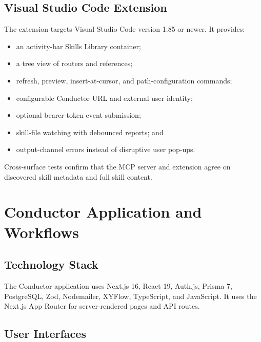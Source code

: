 \documentclass[12pt]{report}
\begin{document}
\section{Visual Studio Code Extension}

The extension targets Visual Studio Code version 1.85 or newer. It provides:

\begin{itemize}
  \item an activity-bar Skills Library container;
  \item a tree view of routers and references;
  \item refresh, preview, insert-at-cursor, and path-configuration commands;
  \item configurable Conductor URL and external user identity;
  \item optional bearer-token event submission;
  \item skill-file watching with debounced reports; and
  \item output-channel errors instead of disruptive user pop-ups.
\end{itemize}

Cross-surface tests confirm that the MCP server and extension agree on discovered skill metadata and full skill content.

\chapter{Conductor Application and Workflows}

\section{Technology Stack}

The Conductor application uses Next.js 16, React 19, Auth.js, Prisma 7, PostgreSQL, Zod, Nodemailer, XYFlow, TypeScript, and JavaScript. It uses the Next.js App Router for server-rendered pages and API routes.

\section{User Interfaces}
\end{document}
